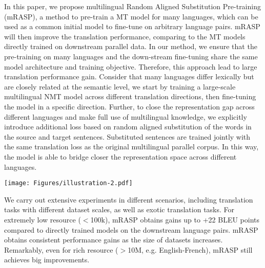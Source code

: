 \documentclass[11pt,a4paper]{article}
\newcommand{\method}{mRASP\xspace}
\begin{document}
In this paper, we propose multilingual Random Aligned Substitution Pre-training (\method), a method to pre-train a MT model for many languages, which can be used as a common initial model to fine-tune on arbitrary language pairs. 
\method will then improve the translation performance, comparing to the  MT models directly trained on downstream parallel data. In our method, we ensure that the pre-training on many languages and the down-stream fine-tuning share the same model architecture and training objective. 
Therefore, this approach lead to large translation performance gain. 
Consider that many languages differ lexically but are closely related at the semantic level, we start by training a large-scale multilingual NMT model across different translation directions, then fine-tuning the model in a specific direction.
Further, to close the representation gap across different languages and make full use of multilingual knowledge, we explicitly introduce additional loss based on random aligned substitution of the words in the source and target sentences. 
Substituted sentences are trained jointly with the same translation loss as the original multilingual parallel corpus.
In this way, the model is able to bridge closer the representation space across different languages.

\begin{figure*}[htbp]
    \centering
    \texttt{[image: Figures/illustration-2.pdf]}
    \caption{The proposed \method method. ``Tok'' denotes token embedding while ``Pos'' denotes position embedding. During the pre-training phase, parallel sentence pairs in many languages are trained using translation loss, together with their substituted ones. We randomly substitute words with the same meanings in the source and target sides. 
    During the fine-tuning phase, we further train the model on the downstream language pairs to obtain specialized MT models.}
    \label{fig:framework}
\end{figure*}

We carry out extensive experiments in different scenarios, including translation tasks with different dataset scales, as well as exotic translation tasks.
 For extremely low resource ($<$100k), \method obtains gains up to +22 BLEU points compared to directly trained models on the downstream language pairs.
 \method obtains consistent performance gains as the size of datasets increases. 
 Remarkably, even for rich resource ($>$10M, e.g. English-French), \method still achieves big improvements. 
\end{document}
